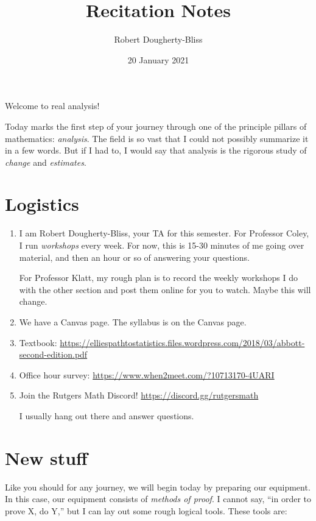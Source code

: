 \documentclass[12pt]{article}
\title{Recitation Notes}
\author{Robert Dougherty-Bliss}
\date{20 January 2021}
\theoremstyle{definition}
\begin{document}
\maketitle

Welcome to real analysis!

Today marks the first step of your journey through one of the principle pillars
of mathematics: \emph{analysis}. The field is so vast that I could not possibly
summarize it in a few words. But if I had to, I would say that analysis is the
rigorous study of \emph{change} and \emph{estimates}.

\section*{Logistics}%
\label{sec:logistics}

\begin{enumerate}
    \item I am Robert Dougherty-Bliss, your TA for this semester. For Professor
        Coley, I run \emph{workshops} every week. For now, this is 15-30
        minutes of me going over material, and then an hour or so of answering
        your questions.

        For Professor Klatt, my rough plan is to record the weekly workshops I
        do with the other section and post them online for you to watch. Maybe
        this will change.

    \item We have a Canvas page. The syllabus is on the Canvas page.

    \item Textbook: \url{https://elliespathtostatistics.files.wordpress.com/2018/03/abbott-second-edition.pdf}

    \item Office hour survey: \url{https://www.when2meet.com/?10713170-4UARI}

    \item Join the Rutgers Math Discord! \url{https://discord.gg/rutgersmath}

        I usually hang out there and answer questions.
\end{enumerate}

\section*{New stuff}%
\label{sec:new_stuff}

Like you should for any journey, we will begin today by preparing our
equipment. In this case, our equipment consists of \emph{methods of proof}. I
cannot say, ``in order to prove X, do Y,'' but I can lay out some rough logical
tools. These tools are:
\end{document}

